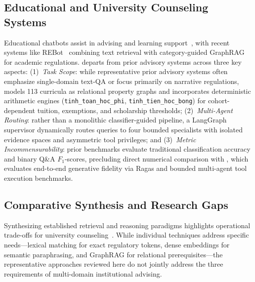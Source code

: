 \subsection{Educational and University Counseling Systems}
\label{sec:educational_counseling}

Educational chatbots assist in advising and learning support~\cite{wollny2021chatbots}, with recent systems like REBot~\cite{ma2025rebot} combining text retrieval with category-guided GraphRAG for academic regulations. \system{} departs from prior advisory systems across three key aspects: (1)~\emph{Task Scope}: while representative prior advisory systems often emphasize single-domain text-QA or focus primarily on narrative regulations, \system{} models 113 curricula as relational property graphs and incorporates deterministic arithmetic engines (\texttt{tinh\_toan\_hoc\_phi}, \texttt{tinh\_tien\_hoc\_bong}) for cohort-dependent tuition, exemptions, and scholarship thresholds; (2)~\emph{Multi-Agent Routing}: rather than a monolithic classifier-guided pipeline, a LangGraph supervisor dynamically routes queries to four bounded specialists with isolated evidence spaces and asymmetric tool privileges; and (3)~\emph{Metric Incommensurability}: prior benchmarks evaluate traditional classification accuracy and binary Q\&A $F_1$-scores, precluding direct numerical comparison with \system{}, which evaluates end-to-end generative fidelity via Ragas and bounded multi-agent tool execution benchmarks.

\subsection{Comparative Synthesis and Research Gaps}
\label{sec:gaps}

Synthesizing established retrieval and reasoning paradigms highlights operational trade-offs for university counseling~\cite{cormack2009rrf,edge2024graphrag,jeong2024adaptiverag,karpukhin2020dpr,robertson2009bm25,schick2023toolformer,wu2023autogen,yao2023react}. While individual techniques address specific needs---lexical matching for exact regulatory tokens, dense embeddings for semantic paraphrasing, and GraphRAG for relational prerequisites---the representative approaches reviewed here do not jointly address the three requirements of multi-domain institutional advising.

